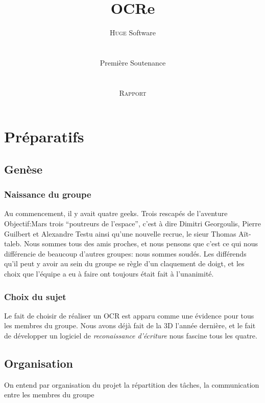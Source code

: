 \documentclass[]{report}
\title{OCRe}
\author{ \textsc{Huge} Software \\
\\
\\
Premi\`ere Soutenance \\
\\
\\
\textsc{Rapport}}
\date{}
\begin{document}
\ifpdf {} \else {} \fi

\maketitle

\pagebreak

\tableofcontents 
\pagebreak

\part{Pr\'eparatifs} 

\label{prt:preparatifs}

\chapter{Gen\`ese} %
\label{cha:genese}
	\section{Naissance du groupe} %
	\label{sec:naissance_du_groupe} 
		Au commencement, il y avait quatre geeks. Trois rescap\'es de l'aventure Objectif:Mars trois ``poutreurs de l'espace'', c'est \`a dire Dimitri Georgoulis, Pierre Guilbert et Alexandre Testu ainsi qu'une nouvelle recrue, le sieur Thomas A\"it-taleb. Nous sommes tous des amis proches, et nous pensons que c'est ce qui nous diff\'erencie de beaucoup d'autres groupes: nous sommes soud\'es. Les diff\'erends qu'il peut y avoir au sein du groupe se r\`egle d'un claquement de doigt, et les choix que l'\'equipe a eu \`a faire ont toujours \'etait fait \`a l'unanimit\'e.

	\section{Choix du sujet} %
	\label{sec:choix_du_sujet} 
		Le fait de choisir de r\'ealiser un OCR est apparu comme une \'evidence pour tous les membres du groupe. Nous avons d\'ej\`a fait de la 3D l'ann\'ee derni\`ere, et le fait de d\'evelopper un logiciel de \emph{reconaissance d'\'ecriture} nous fascine tous les quatre. 

\chapter{Organisation} %
\label{cha:organisation}
	On entend par organisation du projet la r\'epartition des t\^aches, la communication entre les membres du groupe
\end{document}
